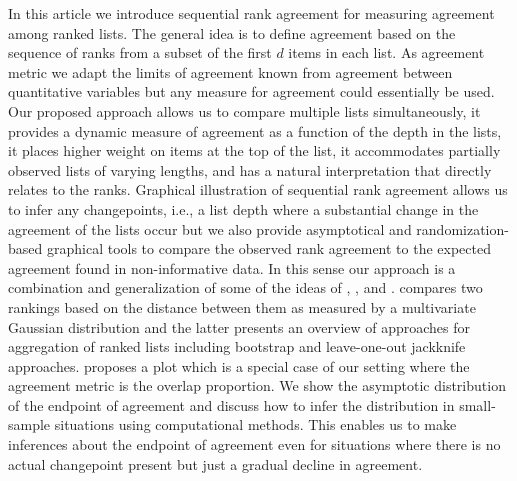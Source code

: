\documentclass[oupdraft]{bio}
\newcommand{\added}[1]{{\color{added}{}#1}}
\begin{document}
In this article we introduce sequential rank agreement for measuring
agreement among ranked lists.  The general idea is to define agreement
based on the sequence of ranks from a subset of the first $d$ items in
each list. As agreement metric we adapt the limits of agreement known
from agreement between quantitative variables
\citep{alt:bland:1983,Carstensen2010} but any measure for agreement
could essentially be used. Our proposed approach allows us to compare
multiple lists simultaneously, it provides a dynamic measure of
agreement as a function of the depth in the lists, it places higher
weight on items at the top of the list, it accommodates partially
observed lists of varying lengths, and has a natural interpretation
that directly relates to the ranks.  Graphical illustration of
sequential rank agreement allows us to infer any changepoints, i.e., a
list depth where a substantial change in the agreement of the lists
occur but we also provide asymptotical and randomization-based
graphical tools to compare the observed rank agreement to the expected
agreement found in non-informative data.  In this sense our approach
is a combination and generalization of some of the ideas of
\added{\citet{iriz:etal:2005}}, \citet{Carterette2009}, and
\citet{Boulesteix2009}. \citet{Carterette2009} compares two rankings
based on the distance between them as measured by a multivariate
Gaussian distribution and the latter presents an overview of
approaches for aggregation of ranked lists including bootstrap and
leave-one-out jackknife approaches. \added{\citet{iriz:etal:2005}
  proposes a plot which is a special case of our setting where the
  agreement metric is the overlap proportion}. We show the asymptotic
distribution of the endpoint of agreement and discuss how to infer the
distribution in small-sample situations using computational
methods. This enables us to make inferences about the endpoint of
agreement even for situations where there is no actual changepoint
present but just a gradual decline in agreement.




\end{document}
